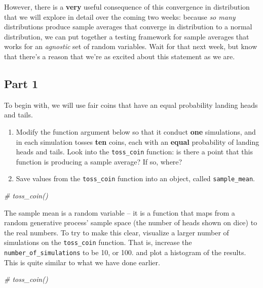 \documentclass[
]{book}
\newenvironment{Shaded}{\begin{snugshade}}{\end{snugshade}}
\newcommand{\CommentTok}[1]{\textcolor[rgb]{0.56,0.35,0.01}{\textit{#1}}}
\providecommand{\tightlist}{%
  \setlength{\itemsep}{0pt}\setlength{\parskip}{0pt}}
\theoremstyle{definition}
\theoremstyle{definition}
\theoremstyle{definition}
\theoremstyle{definition}
\theoremstyle{remark}
\begin{document}
However, there is a \textbf{very} useful consequence of this convergence in distribution that we will explore in detail over the coming two weeks: because \emph{so many} distributions produce sample averages that converge in distribution to a normal distribution, we can put together a testing framework for sample averages that works for an \emph{agnostic} set of random variables. Wait for that next week, but know that there's a reason that we're as excited about this statement as we are.

\subsection{Part 1}\label{part-1}

To begin with, we will use fair coins that have an equal probability landing heads and tails.

\begin{enumerate}
\def\labelenumi{\arabic{enumi}.}
\tightlist
\item
  Modify the function argument below so that it conduct \textbf{one} simulations, and in each simulation tosses \textbf{ten} coins, each with an \textbf{equal} probability of landing heads and tails. Look into the \texttt{toss\_coin} function: is there a point that this function is producing a sample average? If so, where?
\item
  Save values from the \texttt{toss\_coin} function into an object, called \texttt{sample\_mean}.
\end{enumerate}

\begin{Shaded}
\begin{Highlighting}[]
\CommentTok{\# toss\_coin()}
\end{Highlighting}
\end{Shaded}

The sample mean is a random variable -- it is a function that maps from a random generative process' sample space (the number of heads shown on dice) to the real numbers. To try to make this clear, visualize a larger number of simulations on the \texttt{toss\_coin} function. That is, increase the \texttt{number\_of\_simulations} to be 10, or 100. and plot a histogram of the results. This is quite similar to what we have done earlier.

\begin{Shaded}
\begin{Highlighting}[]
\CommentTok{\# toss\_coin()}
\end{Highlighting}
\end{Shaded}
\end{document}
